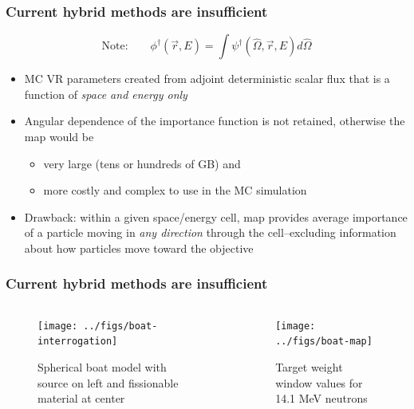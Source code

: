\documentclass[xcolor=x11names,compress,handout]{beamer}
\renewcommand{\(}{\begin{columns}}
\renewcommand{\)}{\end{columns}}
\newcommand{\<}[1]{\begin{column}{#1}}
\renewcommand{\>}{\end{column}}
\newcommand{\vOmega}{\ensuremath{\hat{\Omega}}}
\newcommand{\ve}[1]{\ensuremath{\vec{#1}}}
\begin{document}
\begin{frame}[fragile]
  \frametitle{Current hybrid methods are insufficient}

\[\text{Note:}\qquad\phi^{\dagger}(\ve{r},E) = \int \psi^{\dagger}(\vOmega, 
		\ve{r},E) d\vOmega\]

	\begin{itemize}
	\item MC VR parameters created from adjoint deterministic scalar flux that is a function of \textit{space and energy only} \vspace*{1 em}
	\pause
	\item Angular dependence of the importance function is not retained, otherwise the map would be 
	\begin{itemize}
	  \item very large (tens or hundreds of GB) and
	  \item more costly and complex to use in the MC simulation 
	\end{itemize}
	\pause
	\item Drawback: within a given space/energy cell, map provides average importance of a particle moving in \textit{any direction} through the cell--excluding information about how particles move \alert{toward the objective}
	\end{itemize}

\end{frame}

\begin{frame}[fragile]
  \frametitle{Current hybrid methods are insufficient}

	\begin{columns}
  	\begin{column}{0.5\textwidth}
 	 \begin{center}
 	 \begin{figure}
 	 \texttt{[image: ../figs/boat-interrogation]}  
 	 \caption{Spherical boat model with source on left and fissionable material at center}
 	 \end{figure}
 	 \end{center}
  	\end{column}
 	\begin{column}{0.5\textwidth}
 	 \begin{center}
 	 \begin{figure}
 	 \texttt{[image: ../figs/boat-map]}  
 	 \caption{Target weight window values for 14.1 MeV neutrons}
 	 \end{figure}
 	 \end{center}
  	\end{column}
	\end{columns}

\end{frame}
\end{document}
